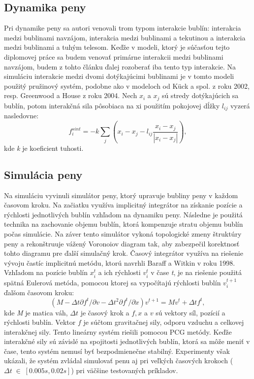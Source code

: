 \subsection{Dynamika peny}

Pri dynamike peny sa autori venovali trom typom interakcie bublín: interakcia medzi bublinami navzájom, interakcia medzi bublinami a tekutinou a interakcia medzi bublinami a tuhým telesom. Keďže v modeli, ktorý je súčasťou tejto diplomovej práce sa budem venovať primárne interakcii medzi bublinami navzájom, budem z tohto článku ďalej rozoberať iba tento typ interakcie. Na simuláciu interakcie medzi dvomi dotýkajúcimi bublinami je v tomto modeli použitý pružinový systém, podobne ako v modeloch od Kück a spol. z roku 2002, resp. Greenwood a House z roku 2004. Nech $x_{i}$ a $x_{j}$ sú stredy dotýkajúcich sa bublín, potom interakčná sila pôsobiaca na xi použitím pokojovej dĺžky $l_{ij}$ vyzerá nasledovne:
\begin{equation}
	f_{i}^{sint} = -k\sum_{j}\left ( x_{i} - x_{j} - l_{ij} \frac{x_{i} - x_{j}}{\left | x_{i} - x_{j} \right |} \right ),
\end{equation}
kde \textit{k} je koeficient tuhosti.

\subsection{Simulácia peny}

Na simuláciu vyvinuli simulátor peny, ktorý upravuje bubliny peny v každom časovom kroku. Na začiatku využíva implicitný integrátor na získanie pozície a rýchlosti jednotlivých bublín vzhľadom na dynamiku peny. Následne je použitá technika na zachovanie objemu bublín, ktorá kompenzuje stratu objemu bublín počas simulácie. Na záver tento simulátor vykoná topologické zmeny štruktúry peny a rekonštruuje vážený Voronoiov diagram tak, aby zabezpečil korektnosť tohto diagramu pre ďalší simulačný krok. Časový integrátor využíva na riešenie vývoju častíc implicitnú metódu, ktorú navrhli Baraff a Witkin v roku 1998. Vzhľadom na pozície bublín ${x_{i}^{t}}$ a ich rýchlosti ${v_{i}^{t}}$ v čase \textit{t}, je na riešenie použitá spätná Eulerová metóda, pomocou ktorej sa vypočítajú rýchlosti bublín ${v_{i}^{t+1}}$ ďalšom časovom kroku:
\begin{equation}
	\left ( M - \Delta t\partial f^{t}/\partial v - \Delta t^{2}\partial f^{t}/\partial x \right )v^{t+1} = Mv^{t} + \Delta tf^{t},
\end{equation}
kde \textit{M} je matica váh, $\Delta t$ je časový krok a $f, x$ a $v$ sú vektory síl, pozícií a rýchlosti bublín. Vektor $f$ je súčtom gravitačnej sily, odporu vzduchu a celkovej interakčnej sily. Tento lineárny systém riešili pomocou PCG metódy. Keďže interakčné sily sú závislé na spojitosti jednotlivých bublín, ktorá sa môže meniť v čase, tento systém nemusí byť bezpodmienečne stabilný. Experimenty však ukázali, že systém zvládal simulovať penu aj pri veľkých časových krokoch ($\Delta t\;\in\;[0.005s, 0.02s]$) pri väčšine testovaných príkladov.

